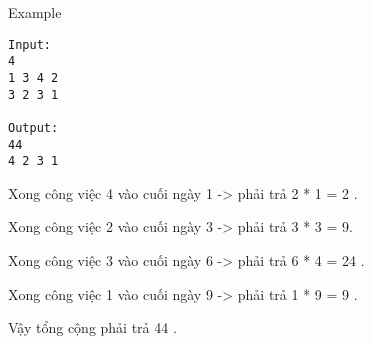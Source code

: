 Example
\begin{verbatim}
Input:
4
1 3 4 2
3 2 3 1

Output:
44
4 2 3 1 

\end{verbatim}

Xong công việc 4 vào cuối ngày 1 -> phải trả 2 * 1 = 2 .


Xong công việc 2 vào cuối ngày 3 -> phải trả 3 * 3 = 9.


Xong công việc 3 vào cuối ngày 6 -> phải trả 6 * 4 = 24 .


Xong công việc 1 vào cuối ngày 9 -> phải trả 1 * 9 = 9 .


Vậy tổng cộng phải trả 44 .